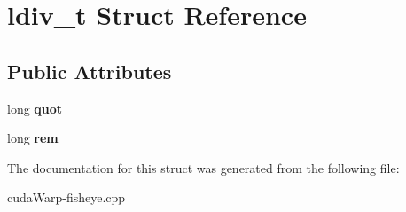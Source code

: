 \hypertarget{structldiv__t}{}\section{ldiv\+\_\+t Struct Reference}
\label{structldiv__t}
\subsection*{Public Attributes}
\begin{DoxyCompactItemize}
\item 
long {\bfseries quot}\hypertarget{structldiv__t_a73efd59c176304c327cb4214d0e5e5c9}{}\label{structldiv__t_a73efd59c176304c327cb4214d0e5e5c9}

\item 
long {\bfseries rem}\hypertarget{structldiv__t_a0f217ff62b8640aa945ec84d6d0bd000}{}\label{structldiv__t_a0f217ff62b8640aa945ec84d6d0bd000}

\end{DoxyCompactItemize}


The documentation for this struct was generated from the following file\+:\begin{DoxyCompactItemize}
\item 
cuda\+Warp-\/fisheye.\+cpp\end{DoxyCompactItemize}
